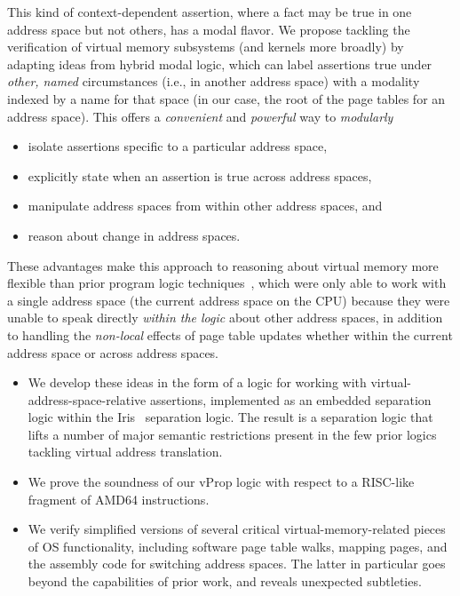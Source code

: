 This kind of context-dependent assertion, where a fact may be true in one address space but not others, has a modal flavor. 
We propose tackling the verification of virtual memory subsystems (and kernels more broadly) by adapting ideas from hybrid
modal logic, which can label assertions true under \emph{other, named} circumstances (i.e., in another address space) with a 
modality indexed by a name for that space (in our case, the root of the page tables for an address space). This offers a 
\textit{convenient} and \textit{powerful} way to \emph{modularly}
\begin{itemize}
\item isolate assertions specific to a particular address space,
\item explicitly state when an assertion is true across address spaces,
\item manipulate address spaces from within other address spaces, and
\item reason about change in address spaces.
\end{itemize}
These advantages make this approach to reasoning about virtual memory more flexible than prior program logic techniques~\cite{kolanski08vstte,kolanski09tphols}, 
which were only able to work with a single address space (the current address space on the CPU) because they were unable
to speak directly \emph{within the logic} about other address spaces, in addition to handling
the \emph{non-local} effects of page table updates whether within the current address space or across address spaces.

\begin{itemize}
\item We develop these ideas in the form of a logic for working with virtual-address-space-relative assertions,
      implemented as an embedded separation logic within the Iris~\cite{jung2018iris} separation logic.
      The result is a separation logic that lifts a number of major semantic restrictions present in the few
      prior logics tackling virtual address translation.
\item We prove the soundness of our \textsf{vProp} logic with respect to a RISC-like fragment of \textsf{AMD64} instructions.
\item We verify simplified versions of several critical virtual-memory-related pieces of OS functionality, 
      including software page table walks, mapping  pages, and the assembly code for switching address spaces. 
      The latter in particular goes beyond the capabilities of prior work, and reveals unexpected
	subtleties.
\end{itemize}

